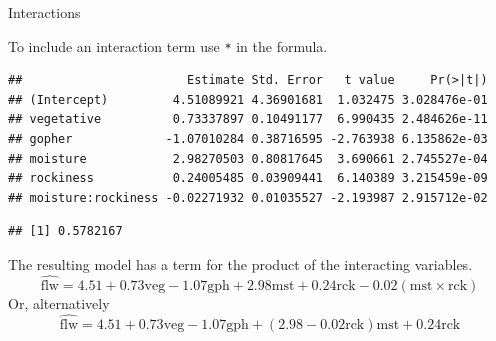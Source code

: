 \documentclass[
  ignorenonframetext,
]{beamer}
\newenvironment{Shaded}{\begin{snugshade}}{\end{snugshade}}
\newcommand{\DataTypeTok}[1]{\textcolor[rgb]{0.13,0.29,0.53}{#1}}
\newcommand{\KeywordTok}[1]{\textcolor[rgb]{0.13,0.29,0.53}{\textbf{#1}}}
\newcommand{\NormalTok}[1]{#1}
\newcommand{\OperatorTok}[1]{\textcolor[rgb]{0.81,0.36,0.00}{\textbf{#1}}}
\newcommand{\StringTok}[1]{\textcolor[rgb]{0.31,0.60,0.02}{#1}}
\begin{document}
\begin{frame}[fragile]{Interactions}
\protect\hypertarget{interactions}{}

To include an interaction term use \texttt{*} in the formula.
\scriptsize

\begin{Shaded}
\end{Shaded}

\begin{verbatim}
##                       Estimate Std. Error   t value     Pr(>|t|)
## (Intercept)         4.51089921 4.36901681  1.032475 3.028476e-01
## vegetative          0.73337897 0.10491177  6.990435 2.484626e-11
## gopher             -1.07010284 0.38716595 -2.763938 6.135862e-03
## moisture            2.98270503 0.80817645  3.690661 2.745527e-04
## rockiness           0.24005485 0.03909441  6.140389 3.215459e-09
## moisture:rockiness -0.02271932 0.01035527 -2.193987 2.915712e-02
\end{verbatim}

\begin{verbatim}
## [1] 0.5782167
\end{verbatim}

\normalsize

The resulting model has a term for the product of the interacting
variables. \[
\widehat{\text{flw}}=4.51+0.73\text{veg}-1.07\text{gph}+2.98\text{mst}+0.24\text{rck}-0.02(\text{mst}\times\text{rck})
\] Or, alternatively \[
\widehat{\text{flw}}=4.51+0.73\text{veg}-1.07\text{gph}+(2.98-0.02\text{rck})\text{mst}+0.24\text{rck}
\]

\end{frame}
\end{document}
